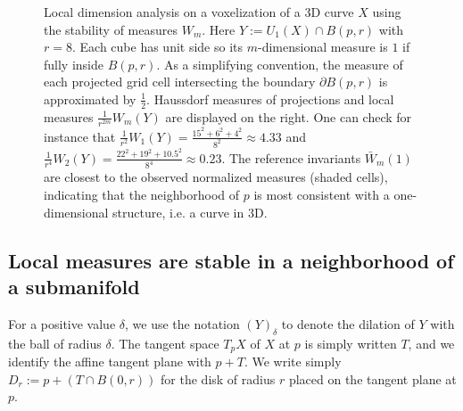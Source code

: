\begin{figure}
  \caption{Local dimension analysis on a voxelization of a 3D curve
    $X$ using the stability of measures $W_m$. Here $Y:=U_1(X) \cap
    B(p,r)$ with $r=8$. Each cube has unit side so its $m$-dimensional
    measure is $1$ if fully inside $B(p,r)$. As a simplifying
    convention, the measure of each projected grid cell intersecting
    the boundary $\partial B(p,r)$ is approximated by $\frac{1}{2}$.
    Haussdorf measures of projections and local measures
    $\frac{1}{r^{2m}}W_m(Y)$ are displayed on the right. One can check
    for instance that $\frac{1}{r^2}W_1(Y) = \frac{15^2+6^2+4^2}{8^2}
    \approx 4.33$ and $\frac{1}{r^4}W_2(Y) =
    \frac{22^2+19^2+10.5^2}{8^4} \approx 0.23$.  The reference
    invariants $\bar{W}_m(1)$ are closest to the observed normalized
    measures (shaded cells), indicating that the neighborhood of $p$
    is most consistent with a one-dimensional structure, i.e. a curve
    in 3D.
    \label{fig-illustration}}
\end{figure}




\subsection{Local measures are stable in a neighborhood of a submanifold}

For a positive value $\delta$, we use the notation $(Y)_\delta$ to
denote the dilation of $Y$ with the ball of radius $\delta$. The
tangent space $T_pX$ of $X$ at $p$ is simply written $T$, and we
identify the affine tangent plane with $p+T$. We write simply
$D_r:=p+(T\cap B(0,r))$ for the disk of radius $r$ placed on the
tangent plane at $p$.

